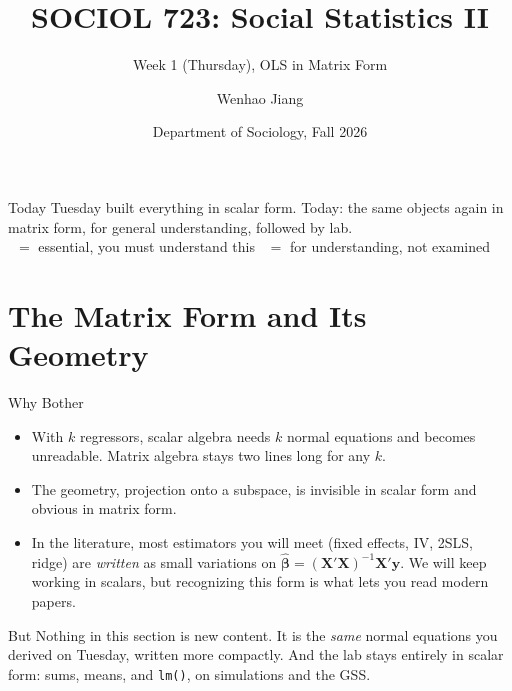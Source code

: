 \documentclass[aspectratio=169,11pt,xcolor=dvipsnames]{beamer}
\title[SOCIOL 723]{SOCIOL 723: Social Statistics II\\[-2pt]}
\subtitle{Week 1 (Thursday), OLS in Matrix Form\\[-6pt]}
\author[Jiang]{Wenhao Jiang\vspace{-2.5em}}
\institute[Duke]{}
\date{Department of Sociology, Fall 2026}
\newcommand{\X}{\bm{X}}
\newcommand{\Y}{\bm{y}}
\newcommand{\bhat}{\hat{\bm{\beta}}}
\newcommand{\adv}{\,\raisebox{0.6pt}{\textcolor{accent}{$\bigstar$}}}
\newcommand{\core}{\,\raisebox{0.6pt}{\textcolor{corestar}{$\bigstar$}}}
\begin{document}
\begin{frame}[plain]
  \titlepage
\end{frame}

\begin{frame}{Today}
  \tableofcontents
  \vskip6pt
  {\footnotesize Tuesday built everything in scalar form. Today: the same
  objects again in matrix form, for general understanding, followed by lab.\\
  \core{} $=$ essential, you must understand this \quad\quad \adv{} $=$ for
  understanding, not examined}
\end{frame}

\section[Matrix Form]{The Matrix Form and Its Geometry}
\begin{frame}\sectionpage\end{frame}

\begin{frame}{Why Bother}
\begin{itemize}\itemsep5pt
  \item With $k$ regressors, scalar algebra needs $k$ normal equations and becomes
        unreadable. Matrix algebra stays two lines long for any $k$.
  \item The \alert{geometry}, projection onto a subspace, is invisible in
        scalar form and obvious in matrix form.
  \item In the literature, most estimators you will meet (fixed effects, IV,
        2SLS, ridge) are \emph{written} as small variations on
        $\bhat = (\X'\X)^{-1}\X'\Y$. We will keep working in scalars, but
        recognizing this form is what lets you read modern papers.
\end{itemize}
\vskip6pt
\begin{alertblock}{But}
Nothing in this section is new content. It is the \emph{same} normal equations
you derived on Tuesday, written more compactly. And the lab stays entirely in
scalar form: sums, means, and \texttt{lm()}, on simulations and the GSS.
\end{alertblock}
\end{frame}
\end{document}
